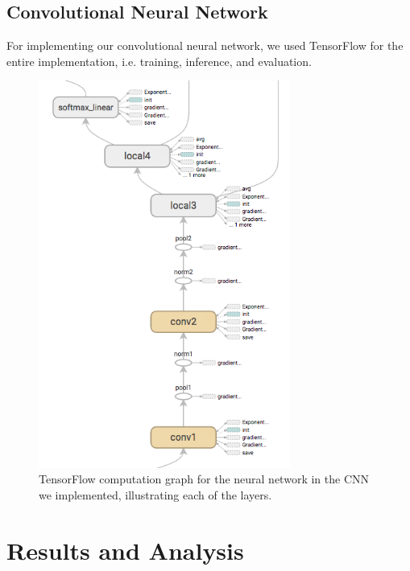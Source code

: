 \documentclass[11pt, twocolumn, twoside]{article}
\begin{document}
\subsection{Convolutional Neural Network}

For implementing our convolutional neural network, we used TensorFlow for the entire implementation, i.e. training, inference, and evaluation.

\begin{figure}
	\centering
	\includegraphics[width=3.25in]{inference_graph}
	\caption{TensorFlow computation graph for the neural network in the CNN we implemented, illustrating each of the layers.}
	\label{fig:inference}
\end{figure}

\section{Results and Analysis}
\end{document}
